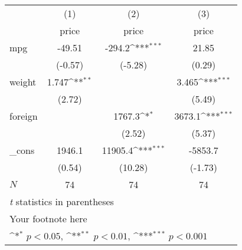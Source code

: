 {
\def\sym#1{\ifmmode^{#1}\else\(^{#1}\)\fi}
\begin{tabular}{l*{3}{c}}
\toprule
          &\multicolumn{1}{c}{(1)}&\multicolumn{1}{c}{(2)}&\multicolumn{1}{c}{(3)}\\
          &\multicolumn{1}{c}{price}&\multicolumn{1}{c}{price}&\multicolumn{1}{c}{price}\\
\midrule
mpg       &   -49.51         &   -294.2\sym{***}&    21.85         \\
          &  (-0.57)         &  (-5.28)         &   (0.29)         \\
\addlinespace
weight    &    1.747\sym{**} &                  &    3.465\sym{***}\\
          &   (2.72)         &                  &   (5.49)         \\
\addlinespace
foreign   &                  &   1767.3\sym{*}  &   3673.1\sym{***}\\
          &                  &   (2.52)         &   (5.37)         \\
\addlinespace
\_cons    &   1946.1         &  11905.4\sym{***}&  -5853.7         \\
          &   (0.54)         &  (10.28)         &  (-1.73)         \\
\midrule
\(N\)     &       74         &       74         &       74         \\
\bottomrule
\multicolumn{4}{l}{\footnotesize \textit{t} statistics in parentheses}\\
\multicolumn{4}{l}{\footnotesize Your footnote here}\\
\multicolumn{4}{l}{\footnotesize \sym{*} \(p<0.05\), \sym{**} \(p<0.01\), \sym{***} \(p<0.001\)}\\
\end{tabular}
}

